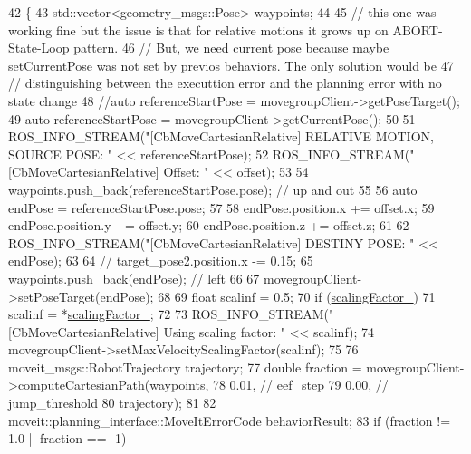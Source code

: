 \begin{DoxyCode}
42 \{
43   std::vector<geometry\_msgs::Pose> waypoints;
44 
45   \textcolor{comment}{// this one was working fine but the issue is that for relative motions it grows up on ABORT-State-Loop
       pattern. }
46   \textcolor{comment}{// But, we need current pose because maybe setCurrentPose was not set by previos behaviors. The only
       solution would be }
47   \textcolor{comment}{// distinguishing between the executtion error and the planning error with no state change}
48   \textcolor{comment}{//auto referenceStartPose = movegroupClient->getPoseTarget(); }
49   \textcolor{keyword}{auto} referenceStartPose = movegroupClient->getCurrentPose();
50 
51   ROS\_INFO\_STREAM(\textcolor{stringliteral}{"[CbMoveCartesianRelative] RELATIVE MOTION, SOURCE POSE: "} << referenceStartPose);
52   ROS\_INFO\_STREAM(\textcolor{stringliteral}{"[CbMoveCartesianRelative] Offset: "} << offset);
53 
54   waypoints.push\_back(referenceStartPose.pose);  \textcolor{comment}{// up and out}
55 
56   \textcolor{keyword}{auto} endPose = referenceStartPose.pose;
57 
58   endPose.position.x += offset.x;
59   endPose.position.y += offset.y;
60   endPose.position.z += offset.z;
61 
62   ROS\_INFO\_STREAM(\textcolor{stringliteral}{"[CbMoveCartesianRelative] DESTINY POSE: "} << endPose);
63 
64   \textcolor{comment}{// target\_pose2.position.x -= 0.15;}
65   waypoints.push\_back(endPose);  \textcolor{comment}{// left}
66 
67   movegroupClient->setPoseTarget(endPose);
68 
69   \textcolor{keywordtype}{float} scalinf = 0.5;
70   \textcolor{keywordflow}{if} (\hyperlink{classcl__move__group__interface_1_1CbMoveCartesianRelative_a2b5e5f05bce94dd3078abfd306c6ef39}{scalingFactor\_})
71     scalinf = *\hyperlink{classcl__move__group__interface_1_1CbMoveCartesianRelative_a2b5e5f05bce94dd3078abfd306c6ef39}{scalingFactor\_};
72 
73   ROS\_INFO\_STREAM(\textcolor{stringliteral}{"[CbMoveCartesianRelative] Using scaling factor: "} << scalinf);
74   movegroupClient->setMaxVelocityScalingFactor(scalinf);
75 
76   moveit\_msgs::RobotTrajectory trajectory;
77   \textcolor{keywordtype}{double} fraction = movegroupClient->computeCartesianPath(waypoints,
78                                                           0.01,  \textcolor{comment}{// eef\_step}
79                                                           0.00,  \textcolor{comment}{// jump\_threshold}
80                                                           trajectory);
81 
82   moveit::planning\_interface::MoveItErrorCode behaviorResult;
83   \textcolor{keywordflow}{if} (fraction != 1.0 || fraction == -1)

\end{DoxyCode}

